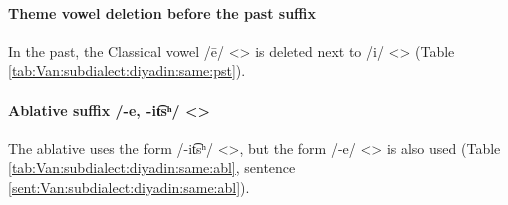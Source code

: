 \paragraph{Theme vowel deletion before the past suffix} 

In the past, the Classical vowel /ē/ <> is deleted next to /i/ <> (Table \ref{tab:Van:subdialect:diyadin:same:pst}). 



\begin{table}[H]
	\centering
	\caption{Deletion of theme vowels before the past suffix in the Diyadin subdialect of the Van dialect}
	\label{tab:Van:subdialect:diyadin:same:pst}
\end{table} 


\paragraph{Ablative suffix /-e, -it͡sʰ/ <>} 

The ablative uses the form /-it͡sʰ/ <>, but the form /-e/ <> is also used (Table \ref{tab:Van:subdialect:diyadin:same:abl}, sentence \ref{sent:Van:subdialect:diyadin:same:abl}). 


